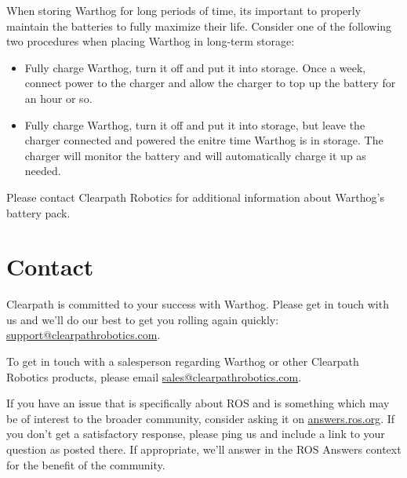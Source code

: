 \documentclass[]{clearpath-latex/clearpath-manual}
\begin{document}
When storing Warthog for long periods of time, its important to properly maintain the batteries to fully maximize their life.  Consider one of the following two procedures when placing Warthog in long-term storage:

\begin{itemize}[nolistsep]
  \item Fully charge Warthog, turn it off and put it into storage.  Once a week, connect power to the charger and allow the charger to top up the battery for an hour or so.
  \item Fully charge Warthog, turn it off and put it into storage, but leave the charger connected and powered the enitre time Warthog is in storage.  The charger will monitor the battery and will automatically charge it up as needed.
\end{itemize}


Please contact Clearpath Robotics for additional information about Warthog's battery pack.


\section{Contact}
\label{contact}

Clearpath is committed to your success with Warthog. Please get in touch with us and we’ll do our best to get
you rolling again quickly: \url{support@clearpathrobotics.com}.

To get in touch with a salesperson regarding Warthog or other Clearpath Robotics products, please email
\url{sales@clearpathrobotics.com}.

If you have an issue that is specifically about ROS and is something which may be of interest to the broader
community, consider asking it on \url{answers.ros.org}. If you don’t get a satisfactory response, please ping us and
include a link to your question as posted there. If appropriate, we’ll answer in the ROS Answers context for
the benefit of the community.

\appendix

\thispagestyle{empty}

\thispagestyle{empty}
\end{document}
